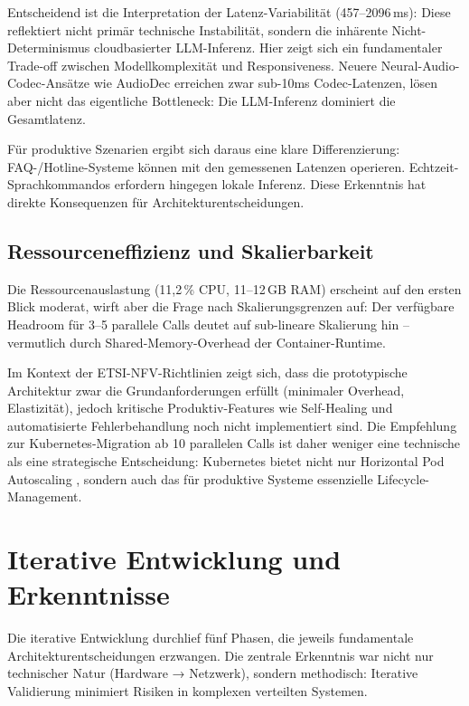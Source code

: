 Entscheidend ist die Interpretation der Latenz-Variabilität (457--2096\,ms): Diese reflektiert nicht primär technische Instabilität, sondern die inhärente Nicht-Determinismus cloudbasierter \acrshort{LLM}-Inferenz. Hier zeigt sich ein fundamentaler Trade-off zwischen Modellkomplexität und Responsiveness. Neuere Neural-Audio-Codec-Ansätze wie \acrshort{AudioDec} \parencite{audiodec_2023} erreichen zwar sub-10ms Codec-Latenzen, lösen aber nicht das eigentliche Bottleneck: Die \acrshort{LLM}-Inferenz dominiert die Gesamtlatenz.

Für produktive Szenarien ergibt sich daraus eine klare Differenzierung: FAQ-/Hotline-Systeme können mit den gemessenen Latenzen operieren. Echtzeit-Sprachkommandos erfordern hingegen lokale Inferenz. Diese Erkenntnis hat direkte Konsequenzen für Architekturentscheidungen.

\subsection{Ressourceneffizienz und Skalierbarkeit}

Die Ressourcenauslastung (11{,}2\,\% \acrshort{CPU}, 11--12\,GB \acrshort{RAM}) erscheint auf den ersten Blick moderat, wirft aber die Frage nach Skalierungsgrenzen auf: Der verfügbare Headroom für 3--5 parallele Calls deutet auf sub-lineare Skalierung hin -- vermutlich durch Shared-Memory-Overhead der Container-Runtime.

Im Kontext der \acrshort{ETSI}-\acrshort{NFV}-Richtlinien \parencite{ETSI-NFV,ETSI-REL} zeigt sich, dass die prototypische Architektur zwar die Grundanforderungen erfüllt (minimaler Overhead, Elastizität), jedoch kritische Produktiv-Features wie Self-Healing und automatisierte Fehlerbehandlung noch nicht implementiert sind. Die Empfehlung zur Kubernetes-Migration ab 10 parallelen Calls ist daher weniger eine technische als eine strategische Entscheidung: Kubernetes bietet nicht nur Horizontal Pod Autoscaling \parencite{Antonova2025}, sondern auch das für produktive Systeme essenzielle Lifecycle-Management.


\section{Iterative Entwicklung und Erkenntnisse}

Die iterative Entwicklung durchlief fünf Phasen, die jeweils fundamentale Architekturentscheidungen erzwangen. Die zentrale Erkenntnis war nicht nur technischer Natur (Hardware → Netzwerk), sondern methodisch: Iterative Validierung minimiert Risiken in komplexen verteilten Systemen.


